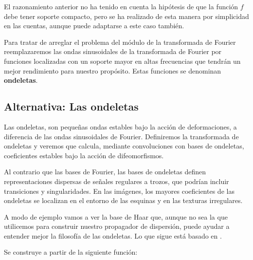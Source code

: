  
\medskip

\noindent El razonamiento anterior no ha tenido en cuenta la hipótesis de que la función $f$ debe tener soporte compacto, pero se ha realizado de esta manera por simplicidad en las cuentas, aunque puede adaptarse a este caso también.

\medskip

\noindent Para tratar de arreglar el problema del módulo de la transformada de Fourier  reemplazaremos las ondas sinusoidales de la transformada de Fourier por funciones localizadas con un soporte mayor en altas frecuencias que tendrán un mejor rendimiento para nuestro propósito. Estas funciones se denominan \textbf{ondeletas}. 

\medskip

\subsection{Alternativa: Las ondeletas}

\noindent Las ondeletas, son pequeñas ondas estables bajo la acción de deformaciones, a diferencia de las ondas sinusoidales de Fourier. Definiremos la transformada de ondeletas y veremos que calcula, mediante convoluciones con bases de ondeletas, coeficientes estables bajo la acción de difeomorfismos.

\medskip

\noindent Al contrario que las bases de Fourier, las bases de ondeletas definen  representaciones dispersas de señales regulares a trozos, que podrían incluir transiciones y singularidades. En las imágenes, los mayores coeficientes de las ondeletas se localizan en el entorno de las esquinas y en las texturas irregulares.

\medskip

\noindent A modo de ejemplo vamos a ver la base de Haar que, aunque no sea la que utilicemos para construir nuestro propagador de dispersión, puede ayudar a entender mejor la filosofía de las ondeletas. Lo que sigue está basado en  \cite{MallatWavelets}.

\medskip

\noindent Se construye a partir de la siguiente función: 

